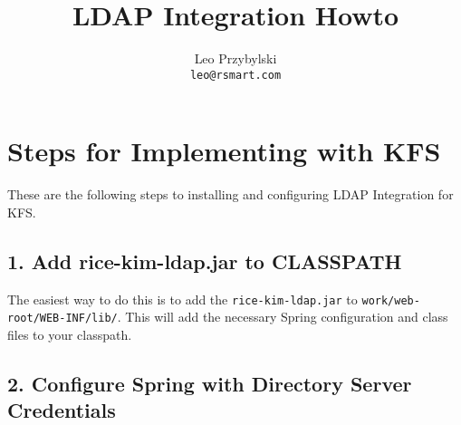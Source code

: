 \documentclass[12pt,notitlepage]{article}
\author{Leo Przybylski \\
\texttt{leo@rsmart.com}}
\title{LDAP Integration Howto}
\begin{document}
\maketitle
\tableofcontents

\lstset{basicstyle=\small,
  breaklines=true,
  includerangemarker=false}

\section{Steps for Implementing with KFS}
These are the following steps to installing and configuring LDAP Integration for KFS.
\subsection*{1. Add rice-kim-ldap.jar to CLASSPATH}
The easiest way to do this is to add the \verb|rice-kim-ldap.jar| to \verb|work/web-root/WEB-INF/lib/|. This 
will add the necessary Spring configuration and class files to your classpath.
\subsection*{2. Configure Spring with Directory Server Credentials}
\end{document}
